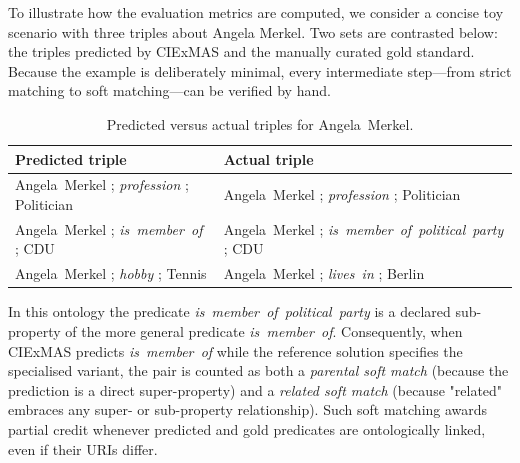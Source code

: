 \documentclass[a4paper,oneside,bibliography=totoc]{scrbook}
\begin{document}
To illustrate how the evaluation metrics are computed, we consider a concise toy scenario with three triples about Angela Merkel.  Two sets are contrasted below: the triples predicted by CIExMAS and the manually curated gold standard.  Because the example is deliberately minimal, every intermediate step—from strict matching to soft matching—can be verified by hand.

\begin{table}[ht]
  \centering
  \label{tab:merkel_triples}
  \begin{tabular}{p{}p{}}
    \toprule
    \textbf{Predicted triple} & \textbf{Actual triple}                                      \\ \midrule
    Angela~Merkel ; \textit{profession} ; Politician
                              & Angela~Merkel ; \textit{profession} ; Politician            \\[0.2em]
    Angela~Merkel ; \textit{is~member~of} ; CDU
                              & Angela~Merkel ; \textit{is~member~of~political~party} ; CDU \\[0.2em]
    Angela~Merkel ; \textit{hobby} ; Tennis
                              & Angela~Merkel ; \textit{lives~in} ; Berlin                  \\
    \bottomrule
  \end{tabular}
  \caption{Predicted versus actual triples for Angela~Merkel.}
\end{table}

In this ontology the predicate \textit{is~member~of~political~party} is a declared sub-property of the more general predicate \textit{is~member~of}.  Consequently, when CIExMAS predicts \textit{is~member~of} while the reference solution specifies the specialised variant, the pair is counted as both a \emph{parental soft match} (because the prediction is a direct super-property) and a \emph{related soft match} (because "related" embraces any super- or sub-property relationship).  Such soft matching awards partial credit whenever predicted and gold predicates are ontologically linked, even if their URIs differ.
\end{document}

